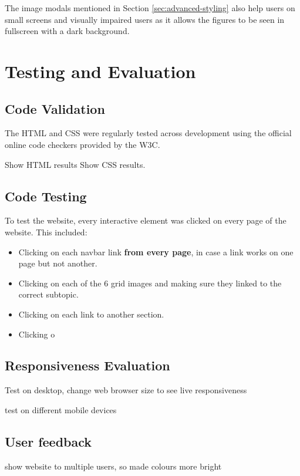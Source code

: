 \documentclass[letterpaper,12pt]{article}
\begin{document}
The image modals mentioned in Section \ref{sec:advanced-styling} also help users on small screens and visually impaired users as it allows the figures to be seen in fullscreen with a dark background.

\section{Testing and Evaluation}
\label{sec:testing-evaluation}

\subsection{Code Validation}

The HTML and CSS were regularly tested across development using the official online code checkers provided by the W3C.

Show HTML results
Show CSS results.

\subsection{Code Testing}

To test the website, every interactive element was clicked on every page of the website. This included:
\begin{itemize}
    \item Clicking on each navbar link \textbf{from every page}, in case a link works on one page but not another.
    \item Clicking on each of the 6 grid images and making sure they linked to the correct subtopic.
    \item Clicking on each link to another section.
    \item Clicking o
\end{itemize}

\subsection{Responsiveness Evaluation}

Test on desktop, change web browser size to see live responsiveness

test on different mobile devices

\subsection{User feedback}

show website to multiple users, so made colours more bright
\end{document}
